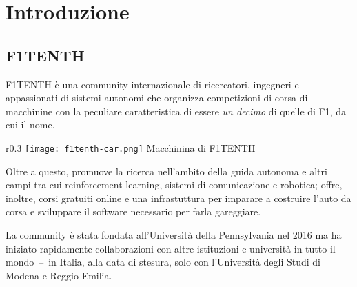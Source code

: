 
\chapter{Introduzione}
\label{chap:intro}


\section{F1TENTH}
F1TENTH è una community internazionale di ricercatori, ingegneri e appassionati di sistemi autonomi
che organizza competizioni di corsa di macchinine con la peculiare caratteristica
di essere \textit{un decimo} di quelle di F1, da cui il nome.
\begin{wrapfigure}{r}{0.3\textwidth}
	\centering
	\texttt{[image: f1tenth-car.png]}
	{\footnotesize Macchinina di F1TENTH}
\end{wrapfigure}
Oltre a questo, promuove la ricerca nell'ambito della guida autonoma
e altri campi tra cui reinforcement learning, sistemi di comunicazione e robotica;
offre, inoltre, corsi gratuiti online e una infrastuttura per imparare a costruire l'auto da corsa
e sviluppare il software necessario per farla gareggiare. \cite{ftenth-web}

La community è stata fondata all'Università della Pennsylvania nel 2016 ma ha iniziato rapidamente
collaborazioni con altre istituzioni e università in tutto il mondo~--~in Italia, alla data di stesura, solo
con l'Università degli Studi di Modena e Reggio Emilia.

